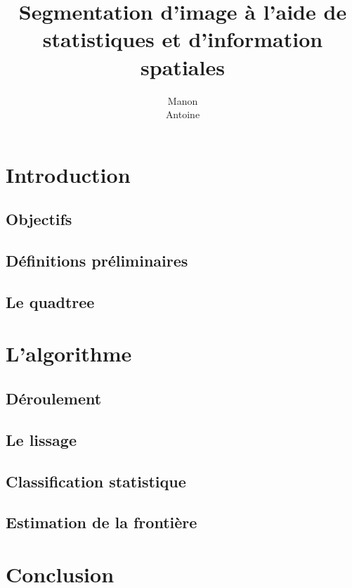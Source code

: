 \documentclass[12pt,titlepage,a4paper]{report}
\title{Segmentation d'image à l'aide de statistiques et d'information spatiales}
\author{Manon \bsc{Ansart}\\Antoine \bsc{Augusti}}
\begin{document}
	\dominitoc
	\tableofcontents

	\chapter{Introduction}
		\section{Objectifs}
			
		\section{Définitions préliminaires}
			
		\section{Le quadtree}
			

	\chapter{L'algorithme}
		\section{Déroulement}
			
		\section{Le lissage}
			
		\section{Classification statistique}
			
		\section{Estimation de la frontière}
			

	\chapter{Conclusion}
		

	
	
\end{document}
